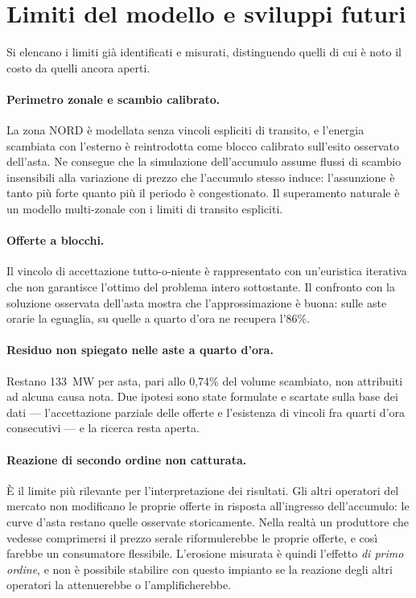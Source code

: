 
\section{Limiti del modello e sviluppi futuri}
\label{sec:limiti}

Si elencano i limiti gi\`a identificati e misurati, distinguendo quelli di cui \`e noto il
costo da quelli ancora aperti.

\paragraph{Perimetro zonale e scambio calibrato.} La zona NORD \`e modellata senza vincoli
espliciti di transito, e l'energia scambiata con l'esterno \`e reintrodotta come blocco
calibrato sull'esito osservato dell'asta. Ne consegue che la simulazione dell'accumulo assume
flussi di scambio insensibili alla variazione di prezzo che l'accumulo stesso induce:
l'assunzione \`e tanto pi\`u forte quanto pi\`u il periodo \`e congestionato. Il superamento
naturale \`e un modello multi-zonale con i limiti di transito espliciti.

\paragraph{Offerte a blocchi.} Il vincolo di accettazione tutto-o-niente \`e rappresentato
con un'euristica iterativa che non garantisce l'ottimo del problema intero sottostante. Il
confronto con la soluzione osservata dell'asta mostra che l'approssimazione \`e buona: sulle
aste orarie la eguaglia, su quelle a quarto d'ora ne recupera l'86\%.

\paragraph{Residuo non spiegato nelle aste a quarto d'ora.} Restano 133~MW per asta, pari
allo 0{,}74\% del volume scambiato, non attribuiti ad alcuna causa nota. Due ipotesi sono
state formulate e scartate sulla base dei dati — l'accettazione parziale delle offerte e
l'esistenza di vincoli fra quarti d'ora consecutivi — e la ricerca resta aperta.

\paragraph{Reazione di secondo ordine non catturata.} \`E il limite pi\`u rilevante per
l'interpretazione dei risultati. Gli altri operatori del mercato non modificano le proprie
offerte in risposta all'ingresso dell'accumulo: le curve d'asta restano quelle osservate
storicamente. Nella realt\`a un produttore che vedesse comprimersi il prezzo serale
riformulerebbe le proprie offerte, e cos\`i farebbe un consumatore flessibile. L'erosione
misurata \`e quindi l'effetto \emph{di primo ordine}, e non \`e possibile stabilire con questo
impianto se la reazione degli altri operatori la attenuerebbe o l'amplificherebbe.

